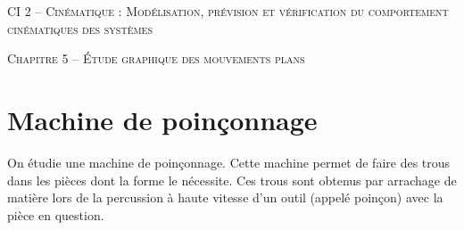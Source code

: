 \documentclass[11pt,oneside]{article}
\begin{document}
\pagestyle{fancy}
\renewcommand{\headrulewidth}{0pt}

\fancyhead{}

\fancyhead[C]{\rule{12cm}{.5pt}}


\renewcommand{\footrulewidth}{0.2pt}

\fancyfoot[C]{\footnotesize{\bfseries \thepage}}



\begin{center}
 \LARGE\textsc{CI 2 -- Cinématique : Modélisation, prévision et vérification du comportement cinématiques des systèmes}
\end{center}

\begin{center}
 \Large\textsc{Chapitre 5 -- Étude graphique des mouvements plans} 
\end{center}

\vspace{1cm}

\section{Machine de poinçonnage}

On étudie une machine de poinçonnage. Cette machine permet de faire des trous dans les pièces dont la forme le nécessite. Ces trous sont obtenus par arrachage de matière lors de la percussion à haute vitesse d'un outil (appelé poinçon) avec la pièce en question.
\end{document}
